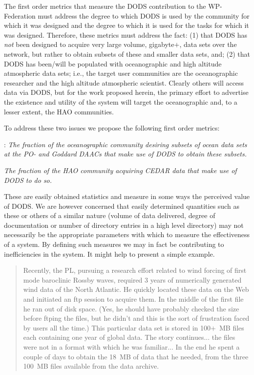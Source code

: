 \documentclass[12pt]{article}
\begin{document}
The first order metrics that measure the \ac{DODS} contribution to the
WP-Federation must address the degree to which \ac{DODS} is used by the 
community for which it was designed and the degree to which it is
used for the tasks for which it was designed. Therefore, these metrics
must address the fact: (1) that \ac{DODS} has \emph{not} been designed to 
acquire very large volume, gigabyte$+$, data sets over the network, but rather
to obtain subsets of these and smaller data sets, and; (2) that \ac{DODS} has 
been/will be populated with oceanographic and high altitude atmospheric data 
sets; i.e., the target user communities are the oceanographic researcher and
the high altitude atmospheric scientist. Clearly others will access
data via \ac{DODS}, but for the work proposed herein, the primary
effort to advertise the existence and utility of the system will target 
the oceanographic and, to a lesser extent, the \ac{HAO} communities.

To address these two issues we propose the following first order metrics:
\bigskip

: \emph{The fraction of the oceanographic community
desiring subsets of ocean data sets at the PO- and Goddard \ac{DAAC}s
that make use of \ac{DODS} to obtain these subsets.}
\medskip

 \emph{The fraction of the \ac{HAO} community 
acquiring \ac{CEDAR} data that make use of \ac{DODS} to do so.}
\medskip

These are easily obtained statistics and measure in some ways the 
perceived value of \ac{DODS}. We are however concerned that easily 
determined quantities such as these or others of a similar nature
(volume of data delivered, degree of documentation or number of 
directory entries in a high level directory) may not necessarily be 
the appropriate parameters with which to measure the effectiveness of a
system.  By defining such measures we may in fact be contributing to
inefficiencies in the system. It might help to present a simple example.

\begin{quote}
  Recently, the PL, pursuing a research effort related to wind forcing
  of first mode baroclinic Rossby waves, required 3 years of numerically
  generated wind data of the North Atlantic.  He quickly located these data
  on the Web and initiated an ftp session to acquire them. In the middle of
  the first file he ran out of disk space. (Yes, he should have probably
  checked the size before ftping the files, but he didn't and this is the
  sort of frustration faced by users all the time.) This particular data set
  is stored in 100$+$~MB files each containing one year of global data. The
  story continues... the files were not in a format with which he was
  familiar... In the end he spent a couple of days to obtain the 18~MB of
  data that he needed, from the three 100~MB files available from the data 
  archive.
\end{quote}
\end{document}
